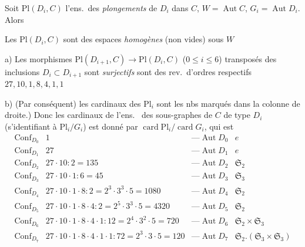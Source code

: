 \documentclass[11pt,a4paper]{article}
\begin{document}
Soit  $\mathrm{Pl}(D_i, C)$ l'ens.\ des
\emph{plongements}  de $D_i$ dans $C$, $W = \operatorname{Aut}
C$, $G_i = \operatorname{Aut} D_i$. Alors

  Les $\mathrm{Pl}(D_i, C)$ sont des espaces
\emph{homogènes} (non vides) sous $W$

a) Les morphismes $\mathrm{Pl}(D_{i+1}, C) \to \mathrm{Pl}(D_i, C)$ ($0
\leqslant i \leqslant 6$) transposés des inclusions $D_i \subset D_{i+1}$ sont
\emph{surjectifs}  sont des rev.\ d'ordres respectifs $27, 10, 1,
8, 4, 1, 1$

b) (Par conséquent) les cardinaux des $\mathrm{Pl}_i$ sont les nbs marqués
dans la colonne de droite.)
  Donc les cardinaux  de
l'ens.\  des sous-graphes 
 de $C$ de type $D_i$ (s'identifiant à
$\mathrm{Pl}_i/G_i$) est donné par $\operatorname{card}
\mathrm{Pl}_i/\operatorname{card} G_i$, qui est
\[
\begin{array}{llll}
\operatorname{Conf}_{D_0} & 1 & \text{---} \operatorname{Aut} D_0 & e \\
\operatorname{Conf}_{D_1} & 27 & \text{---} \operatorname{Aut} D_1 & e \\
\operatorname{Conf}_{D_2} & 27 \cdot 10 : 2 = 135 & \text{---}
\operatorname{Aut} D_2 & \mathfrak{S}_2 \\
\operatorname{Conf}_{D_3} & 27 \cdot 10 \cdot 1 : 6 = 45 & \text{---}
\operatorname{Aut} D_3 & \mathfrak{S}_3 \\
\operatorname{Conf}_{D_4} & 27 \cdot 10 \cdot 1 \cdot 8 : 2 = 2^3 \cdot 3^3
\cdot 5 = 1080 & \text{---} \operatorname{Aut} D_4 & \mathfrak{S}_2 \\
\operatorname{Conf}_{D_5} & 27 \cdot 10 \cdot 1 \cdot 8 \cdot 4 : 2 = 2^5
\cdot 3^3 \cdot 5 = 4320 & \text{---} \operatorname{Aut} D_5 &
\mathfrak{S}_2 \\
\operatorname{Conf}_{D_6} & 27 \cdot 10 \cdot 1 \cdot 8 \cdot 4 \cdot 1 : 12
= 2^4 \cdot 3^2 \cdot 5 = 720 & \text{---} \operatorname{Aut} D_6 &
\mathfrak{S}_2 \times \mathfrak{S}_3 \\
\operatorname{Conf}_{D_7} & 27 \cdot 10 \cdot 1 \cdot 8 \cdot 4 \cdot 1
\cdot 1 : 72 = 2^3 \cdot 3 \cdot 5 = 120 & \text{---} \operatorname{Aut} D_7 &
\mathfrak{S}_2 . (\mathfrak{S}_3 \times \mathfrak{S}_3)
\end{array}
\]
\end{document}
